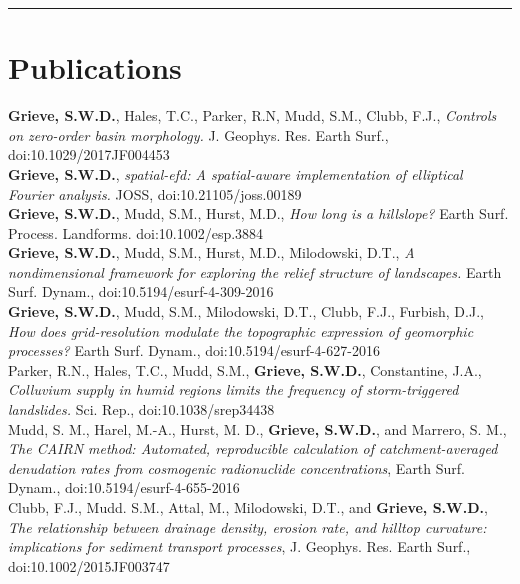 \documentclass[10pt, a4paper]{article}
\newcommand{\years}[1]{\marginnote{\scriptsize #1}}
\begin{document}
\hrule
\section*{Publications}
\noindent

\years{2018}\textbf{Grieve, S.W.D.}, Hales, T.C., Parker, R.N, Mudd, S.M., Clubb, F.J., \textit{Controls on zero-order basin morphology.} J. Geophys. Res. Earth Surf., doi:10.1029/2017JF004453\\[0.05cm]

\years{2017}\textbf{Grieve, S.W.D.}, \textit{spatial-efd: A spatial-aware implementation of elliptical Fourier analysis.} JOSS, doi:10.21105/joss.00189\\[0.05cm]

\years{2016}\textbf{Grieve, S.W.D.}, Mudd, S.M., Hurst, M.D., \textit{How long is a hillslope?} Earth Surf. Process. Landforms. doi:10.1002/esp.3884\\[0.05cm]

\years{2016}\textbf{Grieve, S.W.D.}, Mudd, S.M., Hurst, M.D., Milodowski, D.T., \textit{A nondimensional framework for exploring the relief structure of landscapes.} Earth Surf. Dynam., doi:10.5194/esurf-4-309-2016\\[1.5cm]

\years{2016}\textbf{Grieve, S.W.D.}, Mudd, S.M., Milodowski, D.T., Clubb, F.J., Furbish, D.J., \textit{How does grid-resolution modulate the topographic expression of geomorphic processes?} Earth Surf. Dynam., doi:10.5194/esurf-4-627-2016\\[0.05cm]

\years{2016}Parker, R.N., Hales, T.C., Mudd, S.M., \textbf{Grieve, S.W.D.}, Constantine, J.A., \textit{Colluvium supply in humid regions limits the frequency of storm-triggered landslides.} Sci. Rep., doi:10.1038/srep34438 \\[0.05cm]

\years{2016}Mudd, S. M., Harel, M.-A., Hurst, M. D., \textbf{Grieve, S.W.D.}, and Marrero, S. M., \textit{The CAIRN method: Automated, reproducible calculation of catchment-averaged denudation rates from cosmogenic radionuclide concentrations}, Earth Surf. Dynam., doi:10.5194/esurf-4-655-2016 \\[0.05cm]

\years{2016}Clubb, F.J., Mudd. S.M., Attal, M., Milodowski, D.T., and \textbf{Grieve, S.W.D.}, \textit{The relationship between drainage density, erosion rate, and hilltop curvature: implications for sediment transport processes}, J. Geophys. Res. Earth Surf., doi:10.1002/2015JF003747 \\[0.05cm]
\end{document}
